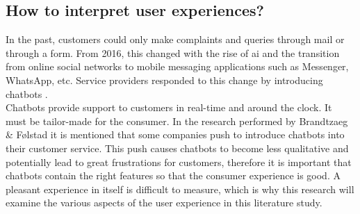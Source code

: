 \subsection{How to interpret user experiences?}
In the past, customers could only make complaints and queries through mail or through a form. From 2016, this changed with the rise of \acrshort{ai} and the transition from online social networks to mobile messaging applications such as Messenger, WhatsApp, etc. Service providers responded to this change by introducing chatbots \citep{Brandtzaeg2018}.\\
\break
Chatbots provide support to customers in real-time and around the clock. It must be tailor-made for the consumer. In the research performed by Brandtzaeg \& Følstad \citep{Brandtzaeg2018} it is mentioned that some companies push to introduce chatbots into their customer service. This push causes chatbots to become less qualitative and potentially lead to great frustrations for customers, therefore it is important that chatbots contain the right features so that the consumer experience is good. A pleasant experience in itself is difficult to measure, which is why this research will examine the various aspects of the user experience in this literature study.

